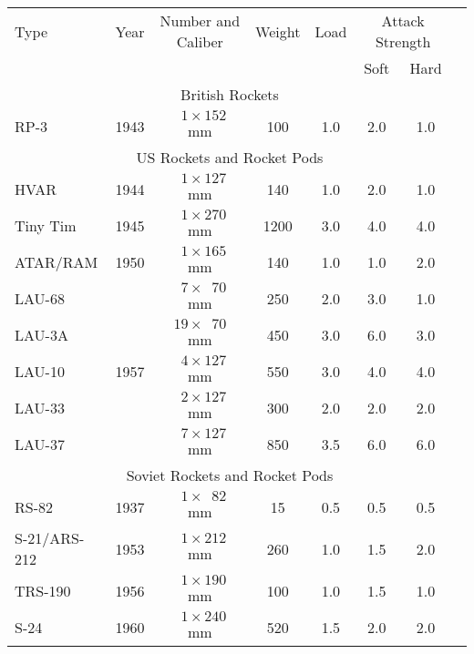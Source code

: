 \begin{twocolumntablefloat}
\begin{twocolumntable}
\begin{tabular}{lrcccccl}
\toprule
Type&
Year&
Number and Caliber&
Weight&
Load&
\multicolumn{2}{c}{Attack Strength}\\
\cmidrule{6-7}
&&&&&Soft&Hard\\
\midrule
\multicolumn{7}{c}{British Rockets}\\
\midrule
RP-3     &1943&$\phantom{0}1 \times \phantom{}152$ mm&\phantom{0}100&1.0&2.0&1.0\\
\midrule
\multicolumn{7}{c}{US Rockets and Rocket Pods}\\
\midrule
HVAR            &1944&$\phantom{0}1 \times \phantom{}127$ mm&\phantom{0}140&1.0&2.0&1.0\\
Tiny Tim        &1945&$\phantom{0}1 \times \phantom{}270$ mm&\phantom{}1200&3.0&4.0&4.0\\
ATAR/RAM        &1950&$\phantom{0}1 \times \phantom{}165$ mm&\phantom{0}140&1.0&1.0&2.0\\
\addlinespace
LAU-68          &    &$\phantom{0}7 \times \phantom{0}70$ mm&\phantom{0}250&2.0&3.0&1.0\\
LAU-3A          &    &$\phantom{}19 \times \phantom{0}70$ mm&\phantom{0}450&3.0&6.0&3.0\\
LAU-10          &1957&$\phantom{0}4 \times \phantom{}127$ mm&\phantom{0}550&3.0&4.0&4.0\\
LAU-33          &    &$\phantom{0}2 \times \phantom{}127$ mm&\phantom{0}300&2.0&2.0&2.0\\
LAU-37          &    &$\phantom{0}7 \times \phantom{}127$ mm&\phantom{0}850&3.5&6.0&6.0\\
\midrule
\multicolumn{7}{c}{Soviet Rockets and Rocket Pods}\\
\midrule
RS-82           &1937&$\phantom{0}1 \times \phantom{0}82$ mm&\phantom{00}15&0.5&0.5&0.5\\
S-21/ARS-212    &1953&$\phantom{0}1 \times \phantom{}212$ mm&\phantom{0}260&1.0&1.5&2.0\\
TRS-190         &1956&$\phantom{0}1 \times \phantom{}190$ mm&\phantom{0}100&1.0&1.5&1.0\\
S-24            &1960&$\phantom{0}1 \times \phantom{}240$ mm&\phantom{0}520&1.5&2.0&2.0\\

\end{tabular}
\end{twocolumntable}
\end{twocolumntablefloat}
